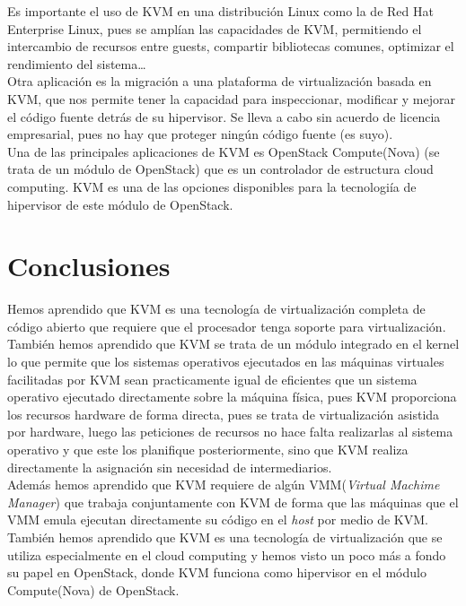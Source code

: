 \documentclass[11pt]{article}
\begin{document}
Es importante el uso de KVM en una distribución Linux como la de Red Hat Enterprise Linux, pues se amplían las capacidades de KVM, permitiendo el intercambio de recursos entre guests, compartir bibliotecas comunes, optimizar el rendimiento del sistema\ldots \\

Otra aplicación es la migración a una plataforma de virtualización basada en KVM, que nos permite tener la capacidad para inspeccionar, modificar y mejorar el código fuente detrás de su hipervisor. Se lleva a cabo sin acuerdo de licencia empresarial, pues no hay que proteger ningún código fuente (es suyo). \\

Una de las principales aplicaciones de KVM es OpenStack Compute(Nova) (se trata de un módulo de OpenStack) que es un controlador de estructura cloud computing. KVM es una de las opciones disponibles para la tecnologiía de hipervisor de este módulo de OpenStack.



\section{Conclusiones}
Hemos aprendido que KVM es una tecnología de virtualización completa de código abierto que requiere que el procesador tenga soporte para virtualización. \\

También hemos aprendido que KVM se trata de un módulo integrado en el kernel lo que permite que los sistemas operativos ejecutados en las máquinas virtuales facilitadas por KVM sean practicamente igual de eficientes que un sistema operativo ejecutado directamente sobre la máquina física, pues KVM proporciona los recursos hardware de forma directa, pues se trata de virtualización asistida por hardware, luego las peticiones de recursos no hace falta realizarlas al sistema operativo y que este los planifique posteriormente, sino que KVM realiza directamente la asignación sin necesidad de intermediarios.\\

Además hemos aprendido que KVM requiere de algún VMM(\textit{Virtual Machime Manager}) que trabaja conjuntamente con KVM de forma que las máquinas que el VMM emula ejecutan directamente su código en el \textit{host} por medio de KVM. \\

También hemos aprendido que KVM es una tecnología de virtualización que se utiliza especialmente en el cloud computing y hemos visto un poco más a fondo su papel en OpenStack, donde KVM funciona como hipervisor en el módulo Compute(Nova) de OpenStack. \\
\end{document}
